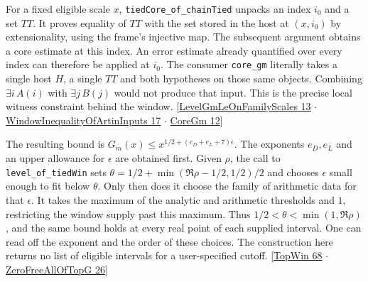 \documentclass[12pt,letterpaper]{article}
\newcommand{\id}[1]{{\small\nolinkurl{#1}}}
\begin{document}
For a fixed eligible scale $x$, \id{tiedCore_of_chainTied} unpacks an index $i_0$ and a set $TT$. It proves equality of $TT$ with the set stored in the host at $(x,i_0)$ by extensionality, using the frame's injective map. The subsequent argument obtains a core estimate at this index. An error estimate already quantified over every index can therefore be applied at $i_0$. The consumer \id{core_gm} literally takes a single host $H$, a single $TT$ and both hypotheses on those same objects. Combining $\exists i\,A(i)$ with $\exists j\,B(j)$ would not produce that input. This is the precise local witness constraint behind the window. {\small\sffamily\color{mute}[\href{https://github.com/nousentllc/riemann-hypothesis/blob/40e56bab026552e089d7afcfeff08d2defb9c005/src/Development/AutomorphicArithmetic/PrimitiveCosets/LevelGmLeOnFamilyScales.lean#L13}{LevelGmLeOnFamilyScales 13} $\cdot$ \href{https://github.com/nousentllc/riemann-hypothesis/blob/40e56bab026552e089d7afcfeff08d2defb9c005/src/Development/AutomorphicArithmetic/PrimitiveCosets/WindowInequalityOfArtinInputs.lean#L17}{WindowInequalityOfArtinInputs 17} $\cdot$ \href{https://github.com/nousentllc/riemann-hypothesis/blob/40e56bab026552e089d7afcfeff08d2defb9c005/src/Development/AutomorphicArithmetic/PrimitiveCosets/CoreGm.lean#L12}{CoreGm 12}]}

The resulting bound is $G_m(x)\le x^{1/2+(e_D+e_L+7)\epsilon}$. The exponents $e_D,e_L$ and an upper allowance for $\epsilon$ are obtained first. Given $\rho$, the call to \id{level_of_tiedWin} sets $\theta=1/2+\min(\Re\rho-1/2,1/2)/2$ and chooses $\epsilon$ small enough to fit below $\theta$. Only then does it choose the family of arithmetic data for that $\epsilon$. It takes the maximum of the analytic and arithmetic thresholds and $1$, restricting the window supply past this maximum. Thus $1/2<\theta<\min(1,\Re\rho)$, and the same bound holds at every real point of each supplied interval. One can read off the exponent and the order of these choices. The construction here returns no list of eligible intervals for a user-specified cutoff. {\small\sffamily\color{mute}[\href{https://github.com/nousentllc/riemann-hypothesis/blob/40e56bab026552e089d7afcfeff08d2defb9c005/src/Formalism/SharpRestriction/RamificationFrobenius/TotientGaloisClasses/TopWin.lean#L68}{TopWin 68} $\cdot$ \href{https://github.com/nousentllc/riemann-hypothesis/blob/40e56bab026552e089d7afcfeff08d2defb9c005/src/Development/AutomorphicArithmetic/CharacterBoxes/ZeroFreeAllOfTopG.lean#L26}{ZeroFreeAllOfTopG 26}]}
\end{document}
